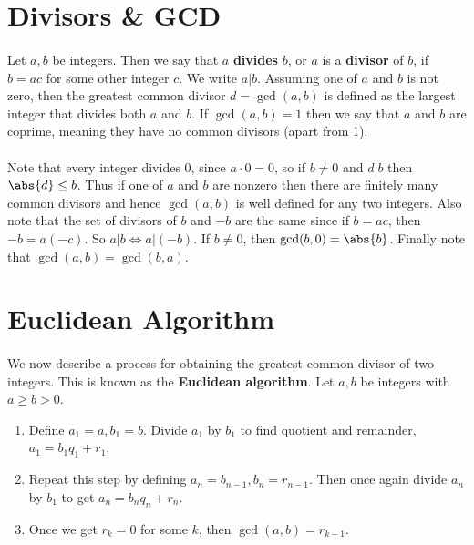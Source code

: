 \documentclass[../abstract_algebra.tex]{subfiles}
\begin{document}
    \section{Divisors \& GCD}
        \paragraph{}
        Let $a,b$ be integers. Then we say that $a$ \textbf{divides} $b$, or $a$ is a \textbf{divisor} of $b$, if $b=ac$ for some other integer $c$.
        We write $a|b$.
        Assuming one of $a$ and $b$ is not zero, then the greatest common divisor $d=\gcd(a,b)$ is defined as the largest integer that divides both $a$ and $b$.
        If $\gcd(a,b)=1$ then we say that $a$ and $b$ are coprime, meaning they have no common divisors (apart from 1).

        \paragraph{}
        Note that every integer divides 0, since $a\cdot0=0$, so if $b\neq0$ and $d|b$ then $\abs{d}\leq b$.
        Thus if one of $a$ and $b$ are nonzero then there are finitely many common divisors and hence $\gcd(a,b)$ is well defined for any two integers.
        Also note that the set of divisors of $b$ and $-b$ are the same since if $b=ac$, then $-b=a(-c)$.
        So $a|b\iff a|(-b)$.
        If $b\neq0$, then $\gcd(b,0)=\abs{b}$.
        Finally note that $\gcd(a,b)=\gcd(b,a)$.

    \section{Euclidean Algorithm}
        \paragraph{}
        We now describe a process for obtaining the greatest common divisor of two integers.
        This is known as the \textbf{Euclidean algorithm}.
        Let $a,b$ be integers with $a\geq b>0$.
        \begin{enumerate}
            \item Define $a_1=a,b_1=b$. Divide $a_1$ by $b_1$ to find quotient and remainder, $a_1=b_1q_1+r_1$.
            \item Repeat this step by defining $a_n=b_{n-1},b_n=r_{n-1}$. Then once again divide $a_n$ by $b_1$ to get $a_n=b_nq_n+r_n$.
            \item Once we get $r_k=0$ for some $k$, then $\gcd(a,b)=r_{k-1}$.
        \end{enumerate}
\end{document}
